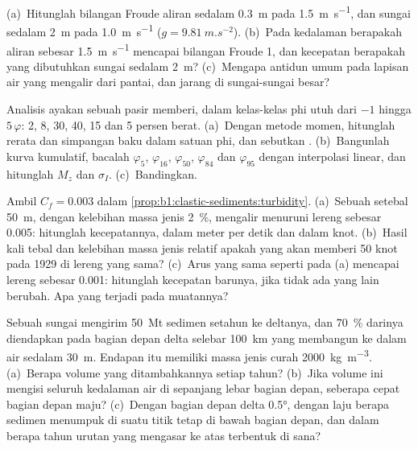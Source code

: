 \begin{exercise}[$\star\star$]\label{exo:b1:clastic-sediments:9}
(a)~Hitunglah bilangan Froude aliran sedalam \qty{0.3}{m} pada
\qty{1.5}{m.s^{-1}}, dan sungai sedalam \qty{2}{m} pada \qty{1.0}{m.s^{-1}} ($g
= \qty{9.81}{m.s^{-2}}$). (b)~Pada kedalaman berapakah aliran sebesar \qty{1.5}{m.s^{-1}} mencapai bilangan Froude 1, dan kecepatan berapakah yang dibutuhkan sungai sedalam \qty{2}{m}? (c)~Mengapa antidun umum pada lapisan air yang mengalir dari pantai, dan jarang di sungai-sungai besar?
\end{exercise}

\begin{exercise}[$\star\star\star$]\label{exo:b1:clastic-sediments:10}
Analisis ayakan sebuah pasir memberi, dalam kelas-kelas phi utuh dari $-1$ hingga $5\,\varphi$: 2, 8, 30, 40, 15 dan 5 persen berat. (a)~Dengan metode momen, hitunglah rerata dan simpangan baku dalam satuan phi, dan sebutkan . (b)~Bangunlah kurva kumulatif, bacalah $\varphi_5$, $\varphi_{16}$, $\varphi_{50}$, $\varphi_{84}$ dan $\varphi_{95}$ dengan interpolasi linear, dan hitunglah $M_z$ dan $\sigma_I$. (c)~Bandingkan.
\end{exercise}

\begin{exercise}[$\star\star\star$]\label{exo:b1:clastic-sediments:11}
Ambil $C_f = 0.003$ dalam \cref{prop:b1:clastic-sediments:turbidity}. (a)~Sebuah  setebal \qty{50}{m}, dengan kelebihan massa jenis \qty{2}{\percent}, mengalir menuruni lereng sebesar \num{0.005}: hitunglah kecepatannya, dalam meter per detik dan dalam knot. (b)~Hasil kali tebal dan kelebihan massa jenis relatif apakah yang akan memberi 50 knot pada 1929 di lereng yang sama? (c)~Arus yang sama seperti pada (a) mencapai lereng sebesar \num{0.001}: hitunglah kecepatan barunya, jika tidak ada yang lain berubah. Apa yang terjadi pada muatannya?
\end{exercise}

\begin{exercise}[$\star\star\star$]\label{exo:b1:clastic-sediments:12}
Sebuah sungai mengirim \qty{50}{Mt} sedimen setahun ke deltanya, dan \qty{70}{\percent} darinya diendapkan pada bagian depan delta selebar \qty{100}{km} yang membangun ke dalam air sedalam \qty{30}{m}. Endapan itu memiliki massa jenis curah \qty{2000}{kg.m^{-3}}. (a)~Berapa volume yang ditambahkannya setiap tahun? (b)~Jika volume ini mengisi seluruh kedalaman air di sepanjang lebar bagian depan, seberapa cepat bagian depan maju? (c)~Dengan  bagian depan delta \ang{0.5}, dengan laju berapa sedimen menumpuk di suatu titik tetap di bawah bagian depan, dan dalam berapa tahun urutan yang mengasar ke atas terbentuk di sana?
\end{exercise}


